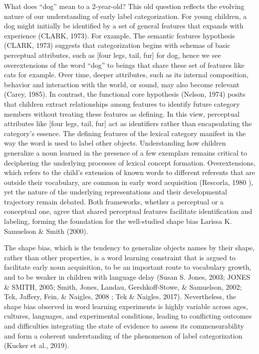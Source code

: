 \documentclass[10pt, letterpaper]{article}
\begin{document}
What does ``dog'' mean to a 2-year-old? This old question reflects the
evolving nature of our understanding of early label categorization. For
young children, a dog might initially be identified by a set of general
features that expands with experience (CLARK, 1973). For example, The
semantic features hypothesis (CLARK, 1973) suggests that categorization
begins with schemas of basic perceptual attributes, such as {[}four
legs, tail, fur{]} for dog, hence we see overextensions of the word
``dog'' to beings that share these set of features like cats for
example. Over time, deeper attributes, such as its internal composition,
behavior and interaction with the world, or sound, may also become
relevant (Carey, 1985). In contrast, the functional core hypothesis
(Nelson, 1974) posits that children extract relationships among features
to identify future category members without treating these features as
defining. In this view, perceptual attributes like {[}four legs, tail,
fur{]} act as identifiers rather than encapsulating the category's
essence. The defining features of the lexical category manifest in the
way the word is used to label other objects. Understanding how children
generalize a noun learned in the presence of a few exemplars remains
critical to deciphering the underlying processes of lexical concept
formation. Overextensions, which refers to the child's extension of
known words to different referents that are outside their vocabulary,
are common in early word acquisition (Rescorla, 1980 ), yet the nature
of the underlying representations and their developmental trajectory
remain debated. Both frameworks, whether a perceptual or a conceptual
one, agree that shared perceptual features facilitate identification and
labeling, forming the foundation for the well-studied shape bias Larissa
K. Samuelson \& Smith (2000).

The shape bias, which is the tendency to generalize objects names by
their shape, rather than other properties, is a word learning constraint
that is argued to facilitate early noun acquisition, to be an important
route to vocabulary growth, and to be weaker in children with language
delay (Susan S. Jones, 2003; JONES \& SMITH, 2005; Smith, Jones, Landau,
Gershkoff-Stowe, \& Samuelson, 2002; Tek, Jaffery, Fein, \& Naigles,
2008 ; Tek \& Naigles, 2017). Nevertheless, the shape bias observed in
word learning experiments is highly variable across ages, cultures,
languages, and experimental conditions, leading to conflicting outcomes
and difficulties integrating the state of evidence to assess its
commensurability and form a coherent understanding of the phenomenon of
label categorization (Kucker et al., 2019).
\end{document}
